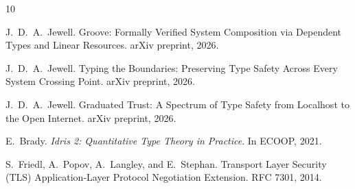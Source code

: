 \documentclass[11pt,a4paper]{article}
\begin{document}

\begin{thebibliography}{10}

J.~D.~A.~Jewell.
\newblock Groove: Formally Verified System Composition via Dependent Types and
  Linear Resources.
\newblock arXiv preprint, 2026.

J.~D.~A.~Jewell.
\newblock Typing the Boundaries: Preserving Type Safety Across Every System
  Crossing Point.
\newblock arXiv preprint, 2026.

J.~D.~A.~Jewell.
\newblock Graduated Trust: A Spectrum of Type Safety from Localhost to the Open
  Internet.
\newblock arXiv preprint, 2026.

E.~Brady.
\newblock \emph{Idris 2: Quantitative Type Theory in Practice}.
\newblock In ECOOP, 2021.

S.~Friedl, A.~Popov, A.~Langley, and E.~Stephan.
\newblock Transport Layer Security (TLS) Application-Layer Protocol Negotiation
  Extension.
\newblock RFC 7301, 2014.

\end{thebibliography}
\end{document}
